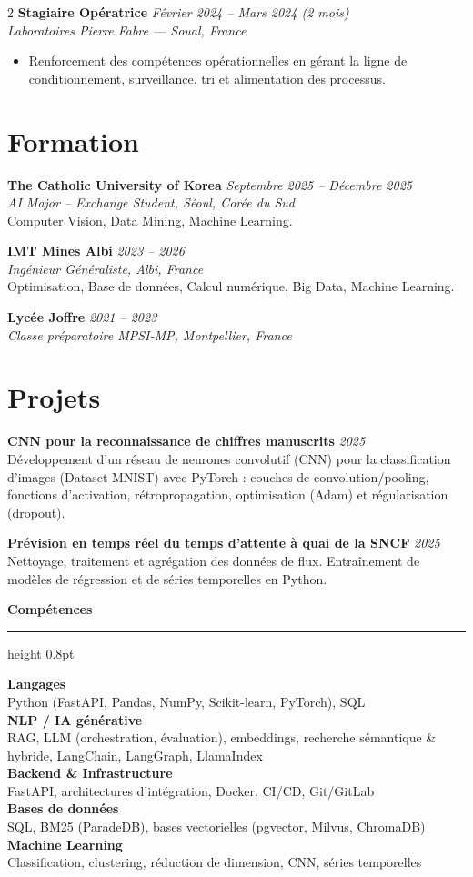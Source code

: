 \documentclass[10.5pt,a4paper]{article}
\newcommand{\sectionrule}{\vspace{-6pt}{\color{accent}\hrule height 1pt}\vspace{2pt}}
\newcommand{\subsectitle}[1]{%
  {\color{accent}\bfseries\large #1}\\[-2pt]
  {\color{accent}\hrule height 0.8pt}\vspace{4pt}
}
\newcommand{\cvexp}[5]{%
  \noindent\textbf{#1} \hfill {\itshape\color{graytext}\small #4}\\
  {\itshape #2 --- #3}\\[-2pt]
  #5
  \vspace{5pt}
}
\newcommand{\cvedu}[5]{%
  \noindent\textbf{#1} \hfill {\itshape\color{graytext}\small #4}\\
  {\itshape #2, #3}\\[1pt]
  {\small #5}
  \vspace{2pt}
}
\newcommand{\cveduplain}[4]{%
  \noindent\textbf{#1} \hfill {\itshape\color{graytext}\small #4}\\
  {\itshape #2, #3}
  \vspace{2pt}
}
\newcommand{\cvproject}[3]{%
  \noindent\textbf{#1} \hfill {\itshape\color{graytext}\small #2}\\[1pt]
  {\small #3}
  \vspace{2pt}
}
\newcommand{\sidebarline}[2]{%
  \noindent\textbf{\small #1}\\
  {\small #2}\\[3pt]
}
\begin{document}
\begin{paracol}{2}
\cvexp{Stagiaire Opératrice}{Laboratoires Pierre Fabre}{Soual, France}{Février 2024 -- Mars 2024 (2 mois)}{%
  \begin{itemize}[leftmargin=12pt, itemsep=2pt, topsep=0pt, partopsep=0pt, parsep=0pt]
    \item Renforcement des compétences opérationnelles en gérant la ligne de conditionnement, surveillance, tri et alimentation des processus.
  \end{itemize}
}

\section*{Formation}
\sectionrule

\cvedu{The Catholic University of Korea}{AI Major -- Exchange Student}{Séoul, Corée du Sud}{Septembre 2025 -- Décembre 2025}{Computer Vision, Data Mining, Machine Learning.}

\cvedu{IMT Mines Albi}{Ingénieur Généraliste}{Albi, France}{2023 -- 2026}{Optimisation, Base de données, Calcul numérique, Big Data, Machine Learning.}

\cveduplain{Lycée Joffre}{Classe préparatoire MPSI-MP}{Montpellier, France}{2021 -- 2023}

\section*{Projets}
\sectionrule

\cvproject{CNN pour la reconnaissance de chiffres manuscrits}{2025}{Développement d'un réseau de neurones convolutif (CNN) pour la classification d'images (Dataset MNIST) avec PyTorch : couches de convolution/pooling, fonctions d'activation, rétropropagation, optimisation (Adam) et régularisation (dropout).}

\cvproject{Prévision en temps réel du temps d'attente à quai de la SNCF}{2025}{Nettoyage, traitement et agrégation des données de flux. Entraînement de modèles de régression et de séries temporelles en Python.}

\switchcolumn

\vspace{2pt}

\subsectitle{Compétences}

\sidebarline{Langages}{Python (FastAPI, Pandas, NumPy, Scikit-learn, PyTorch), SQL}
\sidebarline{NLP / IA générative}{RAG, LLM (orchestration, évaluation), embeddings, recherche sémantique \& hybride, LangChain, LangGraph, LlamaIndex}
\sidebarline{Backend \& Infrastructure}{FastAPI, architectures d'intégration, Docker, CI/CD, Git/GitLab}
\sidebarline{Bases de données}{SQL, BM25 (ParadeDB), bases vectorielles (pgvector, Milvus, ChromaDB)}
\sidebarline{Machine Learning}{Classification, clustering, réduction de dimension, CNN, séries temporelles}


\end{paracol}
\end{document}
